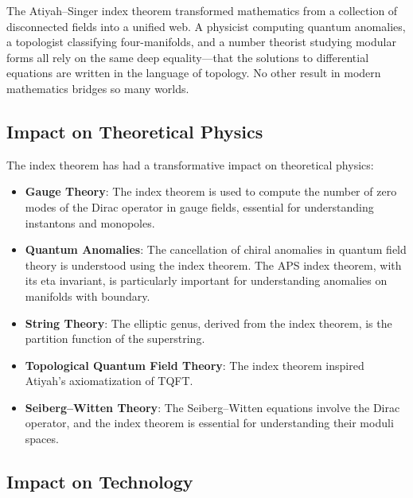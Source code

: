 \begin{whyitmatters}
The Atiyah--Singer index theorem transformed mathematics from a collection of disconnected fields into a unified web. A physicist computing quantum anomalies, a topologist classifying four-manifolds, and a number theorist studying modular forms all rely on the same deep equality---that the solutions to differential equations are written in the language of topology. No other result in modern mathematics bridges so many worlds.
\end{whyitmatters}

\subsection{Impact on Theoretical Physics}

The index theorem has had a transformative impact on theoretical physics:
\begin{itemize}
\item \textbf{Gauge Theory}: The index theorem is used to compute the number of zero modes of the Dirac operator in gauge fields, essential for understanding instantons and monopoles.

\item \textbf{Quantum Anomalies}: The cancellation of chiral anomalies in quantum field theory is understood using the index theorem. The APS index theorem, with its eta invariant, is particularly important for understanding anomalies on manifolds with boundary.

\item \textbf{String Theory}: The elliptic genus, derived from the index theorem, is the partition function of the superstring.

\item \textbf{Topological Quantum Field Theory}: The index theorem inspired Atiyah's axiomatization of TQFT.

\item \textbf{Seiberg--Witten Theory}: The Seiberg--Witten equations involve the Dirac operator, and the index theorem is essential for understanding their moduli spaces.
\end{itemize}

\subsection{Impact on Technology}

